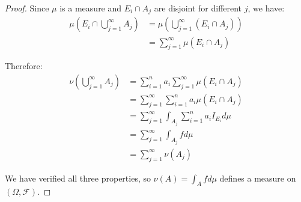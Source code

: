 \documentclass[letterpaper, 11pt]{article}
\newcommand{\1}{\mathds{1}}	%
\theoremstyle{definition}
\begin{document}
\begin{proof}
Since $\mu$ is a measure and $E_i \cap A_j$ are disjoint for different $j$, we have:
\begin{align*}
\mu\left(E_i \cap \bigcup_{j=1}^{\infty} A_j\right) &= \mu\left(\bigcup_{j=1}^{\infty} (E_i \cap A_j)\right)\\
&= \sum_{j=1}^{\infty} \mu(E_i \cap A_j)
\end{align*}

Therefore:
\begin{align*}
\nu\left(\bigcup_{j=1}^{\infty} A_j\right) &= \sum_{i=1}^n a_i \sum_{j=1}^{\infty} \mu(E_i \cap A_j)\\
&= \sum_{j=1}^{\infty} \sum_{i=1}^n a_i \mu(E_i \cap A_j)\\
&= \sum_{j=1}^{\infty} \int_{A_j} \sum_{i=1}^n a_i I_{E_i} d\mu\\
&= \sum_{j=1}^{\infty} \int_{A_j} f d\mu\\
&= \sum_{j=1}^{\infty} \nu(A_j)
\end{align*}

We have verified all three properties, so $\nu(A) = \int_A f d\mu$ defines a measure on $(\Omega, \mathcal{F})$.
\end{proof}
\end{document}
